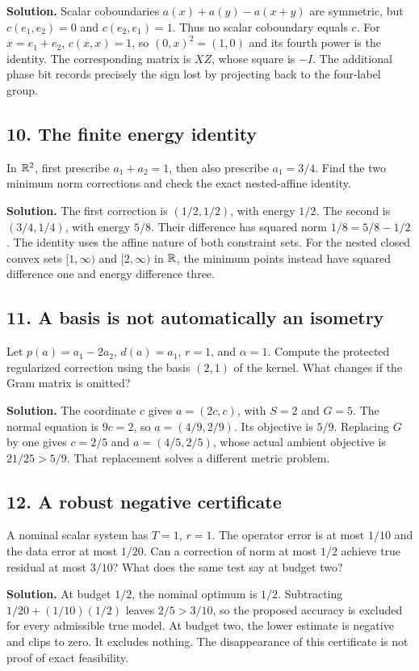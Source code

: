 \textbf{Solution.} Scalar coboundaries $a(x)+a(y)-a(x+y)$ are symmetric, but $c(e_1,e_2)=0$ and $c(e_2,e_1)=1$. Thus no scalar coboundary equals $c$. For $x=e_1+e_2$, $c(x,x)=1$, so $(0,x)^2=(1,0)$ and its fourth power is the identity. The corresponding matrix is $XZ$, whose square is $-I$. The additional phase bit records precisely the sign lost by projecting back to the four-label group.

\subsection*{10. The finite energy identity}
In $\mathbb R^2$, first prescribe $a_1+a_2=1$, then also prescribe $a_1=3/4$. Find the two minimum norm corrections and check the exact nested-affine identity.

\textbf{Solution.} The first correction is $(1/2,1/2)$, with energy $1/2$. The second is $(3/4,1/4)$, with energy $5/8$. Their difference has squared norm $1/8=5/8-1/2$. The identity uses the affine nature of both constraint sets. For the nested closed convex sets $[1,\infty)$ and $[2,\infty)$ in $\mathbb R$, the minimum points instead have squared difference one and energy difference three.

\subsection*{11. A basis is not automatically an isometry}
Let $p(a)=a_1-2a_2$, $d(a)=a_1$, $r=1$, and $\alpha=1$. Compute the protected regularized correction using the basis $(2,1)$ of the kernel. What changes if the Gram matrix is omitted?

\textbf{Solution.} The coordinate $c$ gives $a=(2c,c)$, with $S=2$ and $G=5$. The normal equation is $9c=2$, so $a=(4/9,2/9)$. Its objective is $5/9$. Replacing $G$ by one gives $c=2/5$ and $a=(4/5,2/5)$, whose actual ambient objective is $21/25>5/9$. That replacement solves a different metric problem.

\subsection*{12. A robust negative certificate}
A nominal scalar system has $T=1$, $r=1$. The operator error is at most $1/10$ and the data error at most $1/20$. Can a correction of norm at most $1/2$ achieve true residual at most $3/10$? What does the same test say at budget two?

\textbf{Solution.} At budget $1/2$, the nominal optimum is $1/2$. Subtracting $1/20+(1/10)(1/2)$ leaves $2/5>3/10$, so the proposed accuracy is excluded for every admissible true model. At budget two, the lower estimate is negative and clips to zero. It excludes nothing. The disappearance of this certificate is not proof of exact feasibility.

